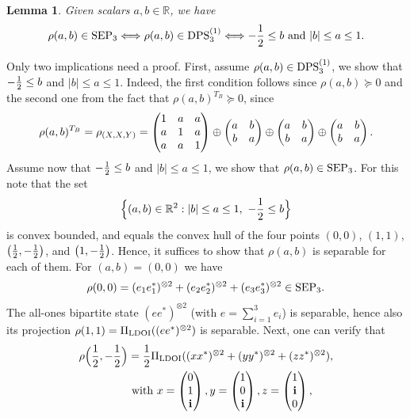 \documentclass[11pt]{article}
\makeatletter
\newcommand{\R}{\ensuremath{\mathbb{R}}}   %
\newcommand{\SEP}{\text{\rm SEP}}
\newcommand{\LDOI}{\text{\rm LDOI}}
\newcommand{\DPS}{\text{\rm DPS}}
\newcommand{\ot}{\otimes}
\newcommand{\bfi}{\mathbf i}
\theoremstyle{plain}
\newtheorem{lemma}[satz]{Lemma}
\renewenvironment{proof}[1][\proofname]{%
  \par
  \pushQED{}%
  \normalfont
  \topsep6\p@\@plus6\p@
  \trivlist
  \item[\hskip\labelsep\itshape #1\@addpunct{.}]%
}{%
  \popQED
  \endtrivlist
}
\makeatother
\begin{document}
\begin{lemma} \label{lem:exampleab}
Given scalars $a,b\in\R$, we have 
$$\rho(a,b)\in \SEP_3 \Longleftrightarrow \rho(a,b)\in \DPS_3^{(1)}\Longleftrightarrow -{1\over 2}\le b \text{ and } |b|\le a\le 1.$$
\end{lemma}

\begin{proof}
Only two implications need a proof. First, assume $\rho(a,b)\in \DPS^{(1)}_3$, we show that $-{1\over 2} \le b$ and $|b|\le a\le 1$. Indeed,  the first condition follows since $\rho(a,b)\succeq 0$ and the second one from the fact that $\rho(a,b)^{T_B}\succeq 0$, since 
$$\rho(a,b)^{T_B} = \rho_{(X,X,Y)}=
 \begin{pmatrix} 1 & a & a \cr a & 1 & a\cr a& a &1\end{pmatrix}
\oplus \begin{pmatrix} a & b \cr b & a\end{pmatrix}
\oplus \begin{pmatrix} a & b \cr b & a\end{pmatrix}
\oplus \begin{pmatrix} a & b \cr b & a\end{pmatrix}.
$$
Assume now that $-{1\over 2}\le b$ and $|b|\le a\le 1$, we show that $\rho(a,b)\in\SEP_3$. For this note that 
the set 
$$\Big\{(a,b)\in\R^2: |b|\le a\le 1, \ -{1\over 2}\le b \Big\}$$ is convex bounded, and equals  the convex hull of the four points 
$(0,0)$, $(1,1)$, $\big({1\over 2}, -{1\over 2}\big)$, and $\big(1, -{1\over 2}\big)$. Hence, it suffices to show that $\rho(a,b)$ is separable for each of them.  For $(a,b)=(0,0)$ we have
$$\rho(0,0)= (e_1e_1^*)^{\ot 2} +(e_2e_2^*)^{\ot 2}+ (e_3e_3^*)^{\ot 2}\in \SEP_3.$$
The all-ones bipartite state $ (ee^*)^{\ot 2}$  (with $e=\sum_{i=1}^3 e_i$) is separable, hence also its projection $\rho(1,1)=\Pi_{\LDOI}((ee^*)^{\ot 2})$ is separable. Next, one can verify that
\begin{align} \label{eq:rhohalfhalf}
\begin{split}
 \rho\Big({1\over 2},-{1\over 2}\Big) & ={1\over 2} \Pi_{\LDOI} ((xx^*)^{\ot 2}+(yy^*)^{\ot 2}+(zz^*)^{\ot 2}),\\ & \text{ with } 
x= \begin{pmatrix} 0 \cr 1 \cr \bfi\end{pmatrix},
 y=  \begin{pmatrix} 1 \cr 0 \cr \bfi\end{pmatrix},
 z=  \begin{pmatrix} 1 \cr \bfi  \cr 0\end{pmatrix},  

\end{split}
\end{align}
\end{proof}
\end{document}
